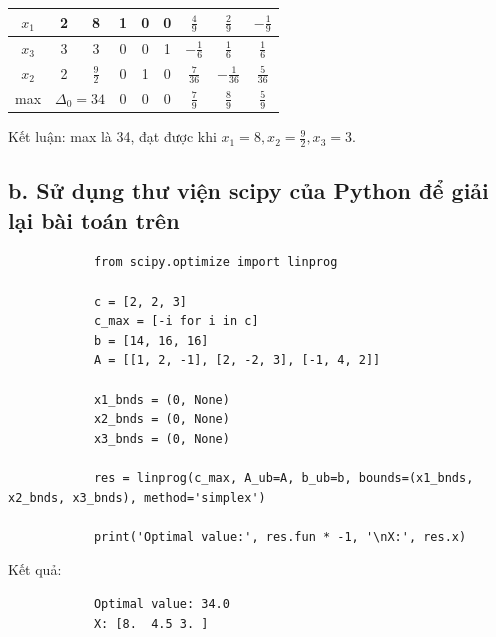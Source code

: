\documentclass[12pt,a4paper]{article}
\begin{document}
\begin{itemize}
\begin{table}[H]
{\begin{tabular}{|ccc|c|c|c|c|c|c|}
						\multicolumn{1}{|c|}{$x_1$}                      & \multicolumn{1}{c|}{2}                          & 8                          & 1                             & 0                             & 0                             & $\frac{4}{9}$                 & $\frac{2}{9}$                 & $-\frac{1}{9}$                \\ \hline
						\multicolumn{1}{|c|}{$x_3$}                      & \multicolumn{1}{c|}{3}                          & 3                          & 0                             & 0                             & 1                             & $-\frac{1}{6}$                & $\frac{1}{6}$                 & $\frac{1}{6}$                 \\ \hline
						\multicolumn{1}{|c|}{$x_2$}                      & \multicolumn{1}{c|}{2}                          & $\frac{9}{2}$              & 0                             & 1                             & 0                             & $\frac{7}{36}$                & $-\frac{1}{36}$               & $\frac{5}{36}$                \\ \hline
						\multicolumn{1}{|c|}{max}                        & \multicolumn{2}{c|}{$\Delta_0 = 34$}                                         & 0                             & 0                             & 0                             & $\frac{7}{9}$                 & $\frac{8}{9}$                 & $\frac{5}{9}$                 \\ \hline
						\end{tabular}}
					\end{table}
					Kết luận: max là 34, đạt được khi $x_1 = 8, x_2 = \frac{9}{2}, x_3 = 3$.
			\end{itemize}
		\subsection*{b. Sử dụng thư viện scipy của Python để giải lại bài toán trên}
			\begin{lstlisting}
			from scipy.optimize import linprog
			
			c = [2, 2, 3]
			c_max = [-i for i in c]
			b = [14, 16, 16]
			A = [[1, 2, -1], [2, -2, 3], [-1, 4, 2]]
			
			x1_bnds = (0, None)
			x2_bnds = (0, None)
			x3_bnds = (0, None)
			
			res = linprog(c_max, A_ub=A, b_ub=b, bounds=(x1_bnds, x2_bnds, x3_bnds), method='simplex')
			
			print('Optimal value:', res.fun * -1, '\nX:', res.x)
			\end{lstlisting}
			Kết quả:
			\begin{lstlisting}
			Optimal value: 34.0 
			X: [8.  4.5 3. ]
			\end{lstlisting}
\end{document}
